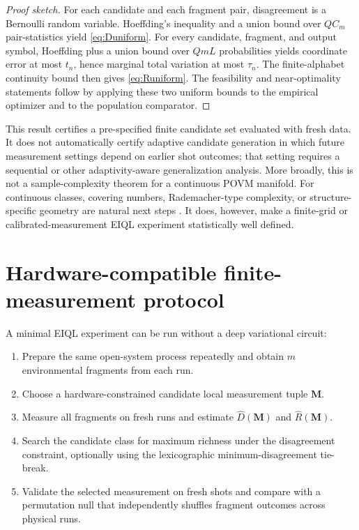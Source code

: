 \begin{proof}[Proof sketch]
For each candidate and each fragment pair, disagreement is a Bernoulli random variable. Hoeffding's inequality and a union bound over $QC_m$ pair-statistics yield \cref{eq:Duniform}. For every candidate, fragment, and output symbol, Hoeffding plus a union bound over $QmL$ probabilities yields coordinate error at most $t_n$, hence marginal total variation at most $\tau_n$. The finite-alphabet continuity bound then gives \cref{eq:Runiform}. The feasibility and near-optimality statements follow by applying these two uniform bounds to the empirical optimizer and to the population comparator.
\end{proof}

This result certifies a pre-specified finite candidate set evaluated with fresh data. It does not automatically certify adaptive candidate generation in which future measurement settings depend on earlier shot outcomes; that setting requires a sequential or other adaptivity-aware generalization analysis. More broadly, this is not a sample-complexity theorem for a continuous POVM manifold. For continuous classes, covering numbers, Rademacher-type complexity, or structure-specific geometry are natural next steps \cite{banchi2023}. It does, however, make a finite-grid or calibrated-measurement EIQL experiment statistically well defined.

\section{Hardware-compatible finite-measurement protocol}

A minimal EIQL experiment can be run without a deep variational circuit:

\begin{enumerate}
\item Prepare the same open-system process repeatedly and obtain $m$ environmental fragments from each run.
\item Choose a hardware-constrained candidate local measurement tuple $\mathbf M$.
\item Measure all fragments on fresh runs and estimate $\widehat D(\mathbf M)$ and $\widehat R(\mathbf M)$.
\item Search the candidate class for maximum richness under the disagreement constraint, optionally using the lexicographic minimum-disagreement tie-break.
\item Validate the selected measurement on fresh shots and compare with a permutation null that independently shuffles fragment outcomes across physical runs.
\end{enumerate}

